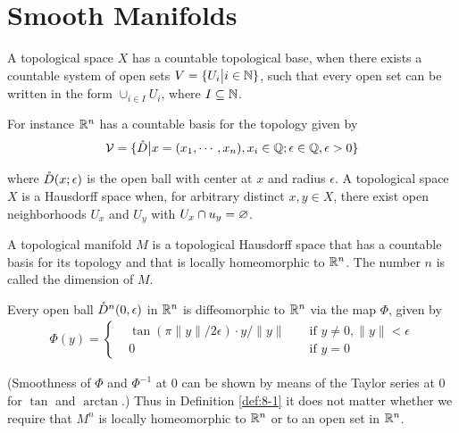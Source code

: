 \chapter{Smooth Manifolds}
A topological space $X$ has a countable topological base, when there exists a
countable system of open sets $V = \{U_i\big| i\in \mathbb{N}\}$, such that every open set can be
written in the form $\cup_{i\in I}U_i$, where $I\subseteq\mathbb{N}$.

For instance $\mathbb{R}^n$ has a countable basis for the topology given by
\begin{align*}
  \mathcal{V} = \{\mathring{D}\big| x=(x_1, \cdots, x_n), x_i\in \mathbb{Q}; \epsilon\in\mathbb{Q}, \epsilon>0\}
\end{align*}

where $\mathring{D}(x;\epsilon)$ is the open ball with center at $x$ and radius $\epsilon$.
A topological space $X$ is a Hausdorff space when, for arbitrary distinct $x,y\in X$,
there exist open neighborhoods $U_x$ and $U_y$ with $U_x\cap u_y=\varnothing$.

\begin{definition}\label{def:8-1}
  A topological manifold $M$ is a topological Hausdorff space that
  has a countable basis for its topology and that is locally homeomorphic to $\mathbb{R}^n$.
  The number $n$ is called the dimension of $M$.
\end{definition}

\begin{remark}\label{remark:8-2}
  Every open ball $\mathring{D}^n(0, \epsilon)$ in $\mathbb{R}^n$ is diffeomorphic to $\mathbb{R}^n$ via the map
  $\Phi$, given by
  \begin{align*}
    \Phi(y) = \left\{\begin{aligned}
      & \tan(\pi\|y\|/2\epsilon)\cdot y/\|y\| && \text{ if } y\neq 0, \|y\|<\epsilon \\
      & 0 && \text{ if } y = 0
    \end{aligned}\right.
  \end{align*}

  (Smoothness of $\Phi$ and $\Phi^{-1}$ at 0 can be shown by means of the Taylor series at 0
  for $\tan$ and $\arctan$.) Thus in Definition \ref{def:8-1} it does not matter whether we require
  that $M^n$ is locally homeomorphic to $\mathbb{R}^n$ or to an open set in $\mathbb{R}^n$.
\end{remark}


